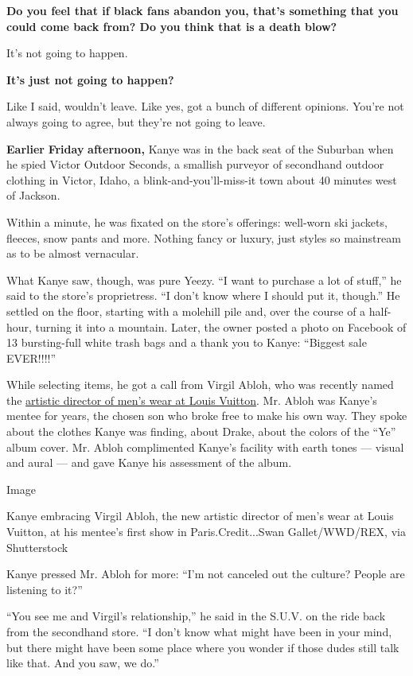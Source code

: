 \textbf{Do you feel that if black fans abandon you, that's something
that you could come back from? Do you think that is a death blow?}

It's not going to happen.

\textbf{It's just not going to happen?}

Like I said, wouldn't leave. Like yes, got a bunch of different
opinions. You're not always going to agree, but they're not going to
leave.

\textbf{Earlier} \textbf{Friday} \textbf{afternoon,} Kanye was in the
back seat of the Suburban when he spied Victor Outdoor Seconds, a
smallish purveyor of secondhand outdoor clothing in Victor, Idaho, a
blink-and-you'll-miss-it town about 40 minutes west of Jackson.

Within a minute, he was fixated on the store's offerings: well-worn ski
jackets, fleeces, snow pants and more. Nothing fancy or luxury, just
styles so mainstream as to be almost vernacular.

What Kanye saw, though, was pure Yeezy. ``I want to purchase a lot of
stuff,'' he said to the store's proprietress. ``I don't know where I
should put it, though.'' He settled on the floor, starting with a
molehill pile and, over the course of a half-hour, turning it into a
mountain. Later, the owner posted a photo on Facebook of 13
bursting-full white trash bags and a thank you to Kanye: ``Biggest sale
EVER!!!!''

While selecting items, he got a call from Virgil Abloh, who was recently
named the
\href{https://www.nytimes3xbfgragh.onion/2018/06/22/fashion/louis-vuitton-virgil-abloh-paris.html}{artistic
director of men's wear at Louis Vuitton}. Mr. Abloh was Kanye's mentee
for years, the chosen son who broke free to make his own way. They spoke
about the clothes Kanye was finding, about Drake, about the colors of
the ``Ye'' album cover. Mr. Abloh complimented Kanye's facility with
earth tones --- visual and aural --- and gave Kanye his assessment of
the album.

Image

Kanye embracing Virgil Abloh, the new artistic director of men's wear at
Louis Vuitton, at his mentee's first show in Paris.Credit...Swan
Gallet/WWD/REX, via Shutterstock

Kanye pressed Mr. Abloh for more: ``I'm not canceled out the culture?
People are listening to it?''

``You see me and Virgil's relationship,'' he said in the S.U.V. on the
ride back from the secondhand store. ``I don't know what might have been
in your mind, but there might have been some place where you wonder if
those dudes still talk like that. And you saw, we do.''


